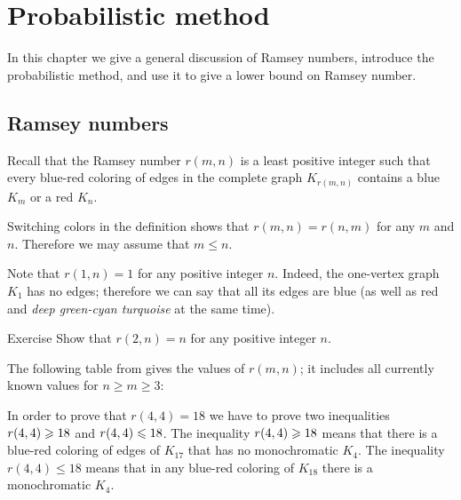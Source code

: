 \chapter{Probabilistic method}

In this chapter we give a general discussion of Ramsey numbers, introduce the probabilistic method, and use it to give a lower bound on Ramsey number.

\section*{Ramsey numbers}

Recall that the Ramsey number $r(m,n)$ is a least positive integer such that every blue-red coloring of edges in the complete graph $K_{r(m, n)}$ contains a blue $K_m$ or a red $K_n$.

Switching colors in the definition shows that $r(m,n)=r(n,m)$ for any $m$ and $n$.
Therefore we may assume that $m\le n$.

Note that $r(1,n)=1$ for any positive integer $n$.
Indeed, the one-vertex graph $K_1$ has no edges;
therefore we can say that all its edges are blue (as well as red and \emph{deep green-cyan turquoise} at the same time).

\begin{thm}{Exercise}
Show that $r(2,n)=n$ for any positive integer $n$.
\end{thm}

The following table from \cite{radziszowski} gives the values of $r(m,n)$;
it includes all currently known values for $n\ge m\ge 3$:

\begin{table}[h!]\label{ramsey-table}
%
\end{table}

In order to prove that $r(4,4)=18$ we have to prove two inequalities $r(4,4)\z\ge 18$ and $r(4,4)\z\le 18$.
The inequality $r(4,4)\z\ge 18$ means that there is a blue-red coloring of edges of $K_{17}$ that has no monochromatic $K_4$.
The inequality $r(4,4)\le 18$ means that in any blue-red coloring of $K_{18}$ there is a monochromatic $K_4$.

